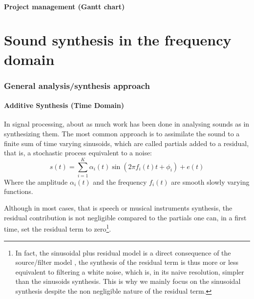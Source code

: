 \documentclass[]{article}
\begin{document}
\subsection{Project management (Gantt chart)}
\begin{figure}[H]
	\centering
\end{figure}

\newpage
\part{Sound synthesis in the frequency domain}
\section{General analysis/synthesis approach}\label{part:general-approach}
\subsection{Additive Synthesis (Time Domain)}\label{sec:additive-synthesis-(time-domain)}
In signal processing, about as much work has been done in analysing sounds as in synthesizing them. The most common approach is to assimilate the sound to a finite sum of time varying sinusoids, which are called partials \cite{quatieri2002audio} added to a residual, that is, a stochastic process equivalent to a noise:
\begin{equation}
s(t) = \sum_{i=1}^{K}\alpha_i(t) \sin(2\pi f_i(t) t + \phi_{i}) + e(t)
\end{equation}
Where the amplitude $\alpha_i(t)$ and the frequency $f_i(t)$ are smooth slowly varying functions.

Although in most cases, that is speech or musical instruments synthesis, the residual contribution is not negligible compared to the partials \cite{quatieri2002audio, rodet1992spectral} one can, in a first time, set the residual term to zero\footnote{In fact, the sinusoidal plus residual model is a direct consequence of the source/filter model \cite{mcaulay1986speech}, the synthesis of the residual term is thus more or less equivalent to filtering a white noise, which is, in its naive resolution, simpler than the sinusoids synthesis. This is why we mainly focus on the sinusoidal synthesis despite the non negligible nature of the residual term.}.
\end{document}
